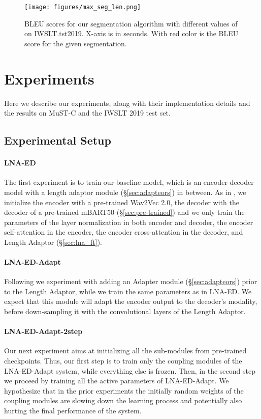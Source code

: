 \documentclass[11pt,a4paper]{article}
\begin{document}
        \begin{figure}[t]
            \centering
            \texttt{[image: figures/max\_seg\_len.png]}
            \caption{BLEU scores for our segmentation algorithm with different values of  on IWSLT.tst2019. X-axis is in seconds. With red color is the BLEU score for the given segmentation.}
            \label{fig:segm}
        \end{figure}


\section{Experiments}

    Here we describe our experiments, along with their implementation details and the results on MuST-C and the IWSLT 2019 test set.

    \subsection{Experimental Setup}
    \label{sec:exp_setup}
    
        \paragraph{LNA-ED} The first experiment is to train our baseline model, which is an encoder-decoder model with a length adaptor module (\S \ref{sec:adapteors}) in between. As in \citet{lna}, we initialize the encoder with a pre-trained Wav2Vec 2.0, the decoder with the decoder of a pre-trained mBART50 (\S \ref{sec:pre-trained}) and we only train the parameters of the layer normalization in both encoder and decoder, the encoder self-attention in the encoder, the encoder cross-attention in the decoder, and Length Adaptor (\S \ref{sec:lna_ft}).
        
        \paragraph{LNA-ED-Adapt} Following we experiment with adding an Adapter module (\S \ref{sec:adapteors}) prior to the Length Adaptor, while we train the same parameters as in LNA-ED. We expect that this module will adapt the encoder output to the decoder's modality, before down-sampling it with the convolutional layers of the Length Adaptor.
        
        \paragraph{LNA-ED-Adapt-2step} Our next experiment aims at initializing all the sub-modules from pre-trained checkpoints. Thus, our first step is to train only the coupling modules of the LNA-ED-Adapt system, while everything else is frozen. Then, in the second step we proceed by training all the active parameters of LNA-ED-Adapt. We hypothesize that in the prior experiments the initially random weights of the coupling modules are slowing down the learning process and potentially also hurting the final performance of the system.
        
\end{document}
